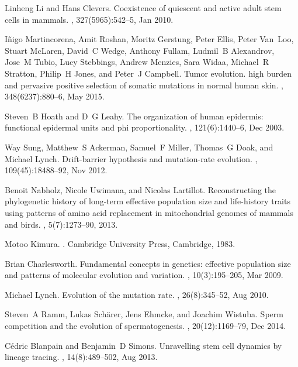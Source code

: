 \documentclass[aps,singlecolumn]{revtex4-1}
\begin{document}
\begin{thebibliography}{10}
Linheng Li and Hans Clevers.
\newblock Coexistence of quiescent and active adult stem cells in mammals.
, 327(5965):542--5, Jan 2010.

I{\~n}igo Martincorena, Amit Roshan, Moritz Gerstung, Peter Ellis, Peter
  Van~Loo, Stuart McLaren, David~C Wedge, Anthony Fullam, Ludmil~B Alexandrov,
  Jose~M Tubio, Lucy Stebbings, Andrew Menzies, Sara Widaa, Michael~R Stratton,
  Philip~H Jones, and Peter~J Campbell.
\newblock Tumor evolution. high burden and pervasive positive selection of
  somatic mutations in normal human skin.
, 348(6237):880--6, May 2015.

Steven~B Hoath and D~G Leahy.
\newblock The organization of human epidermis: functional epidermal units and
  phi proportionality.
, 121(6):1440--6, Dec 2003.

Way Sung, Matthew~S Ackerman, Samuel~F Miller, Thomas~G Doak, and Michael
  Lynch.
\newblock Drift-barrier hypothesis and mutation-rate evolution.
, 109(45):18488--92, Nov 2012.

Benoit Nabholz, Nicole Uwimana, and Nicolas Lartillot.
\newblock Reconstructing the phylogenetic history of long-term effective
  population size and life-history traits using patterns of amino acid
  replacement in mitochondrial genomes of mammals and birds.
, 5(7):1273--90, 2013.

Motoo Kimura.
.
\newblock Cambridge University Press, Cambridge, 1983.

Brian Charlesworth.
\newblock Fundamental concepts in genetics: effective population size and
  patterns of molecular evolution and variation.
, 10(3):195--205, Mar 2009.

Michael Lynch.
\newblock Evolution of the mutation rate.
, 26(8):345--52, Aug 2010.

Steven~A Ramm, Lukas Sch{\"a}rer, Jens Ehmcke, and Joachim Wistuba.
\newblock Sperm competition and the evolution of spermatogenesis.
, 20(12):1169--79, Dec 2014.

C{\'e}dric Blanpain and Benjamin~D Simons.
\newblock Unravelling stem cell dynamics by lineage tracing.
, 14(8):489--502, Aug 2013.


\end{thebibliography}
\end{document}
